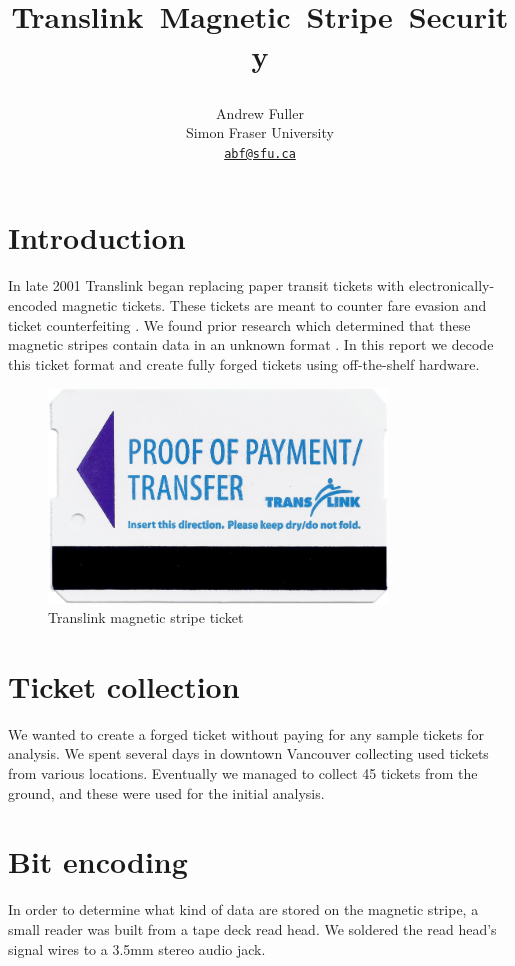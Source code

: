 \documentclass[fontsize=12pt]{scrartcl}
\title{ \vspace{-1in} 	\usefont{OT1}{bch}{b}{n}
    	\LARGE \strut \mbox{Translink~Magnetic~Stripe~Security}
 \vspace{-0.0in}
}
\author{ \usefont{OT1}{bch}{m}{n}
        Andrew Fuller\\		\usefont{OT1}{bch}{m}{n}
        Simon Fraser University\\
        \href{mailto:abf@sfu.ca}{\nolinkurl{abf@sfu.ca}}
}
\date{}
\begin{document}
\maketitle
 \vspace{-0.4in}
\section{Introduction}
In late 2001 Translink began replacing paper transit tickets with electronically-encoded magnetic tickets. These tickets are meant to counter fare evasion and ticket counterfeiting \cite{debut}. We found prior research which determined that these magnetic stripes contain data in an unknown format \cite{ubc}. In this report we decode this ticket format and create fully forged tickets using off-the-shelf hardware.

\begin{figure}[ht!]
\centering
\includegraphics[width=90mm]{ticket1_front.png}
\caption{Translink magnetic stripe ticket}
\end{figure}

\section{Ticket collection}
We wanted to create a forged ticket without paying for any sample tickets for analysis. We spent several days in downtown Vancouver collecting used tickets from various locations. Eventually we managed to collect 45 tickets from the ground, and these were used for the initial analysis.

\section{Bit encoding}
In order to determine what kind of data are stored on the magnetic stripe, a small reader was built from a tape deck read head. We soldered the read head's signal wires to a 3.5mm stereo audio jack.
\end{document}
